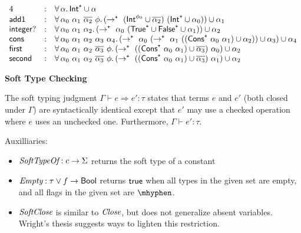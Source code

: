 \documentclass{article}
\begin{document}
\[\begin{array}{l c l}
   4 & : & \forall\,\alpha.\,\mathsf{Int}^{\texttt{+}} \cup \alpha
\\ \mathsf{add1} & : & \forall\,\alpha_0~\alpha_1~\overline{\alpha_2}~\phi.\,(\rightarrow^{\texttt{+}}~(\mathsf{Int}^{\phi_0} \cup \overline{\alpha_2})~(\mathsf{Int}^{\texttt{+}} \cup \alpha_0)) \cup \alpha_1
\\ \mathsf{integer?} & : & \forall\,\alpha_0~\alpha_1~\alpha_2.\,(\rightarrow^{\texttt{+}}~\alpha_0~(\mathsf{True}^{\texttt{+}} \cup \mathsf{False}^{\texttt{+}} \cup \alpha_1)) \cup \alpha_2
\\ \mathsf{cons} & : & \forall\,\alpha_0~\alpha_1~\alpha_2~\alpha_3~\alpha_4.\,(\rightarrow^{\texttt{+}}~\alpha_0~(\rightarrow^{\texttt{+}}~\alpha_1~((\mathsf{Cons}^{\texttt{+}}~\alpha_0~\alpha_1) \cup \alpha_2)) \cup \alpha_3) \cup \alpha_4
\\ \mathsf{first} & : & \forall\,\alpha_0~\alpha_1~\alpha_2~\overline{\alpha_3}~\phi.\,(\rightarrow^{\texttt{+}}~((\mathsf{Cons}^{\texttt{+}}~\alpha_0~\alpha_1) \cup \overline{\alpha_3})~\alpha_0) \cup \alpha_2
\\ \mathsf{second} & : & \forall\,\alpha_0~\alpha_1~\alpha_2~\overline{\alpha_3}~\phi.\,(\rightarrow^{\texttt{+}}~((\mathsf{Cons}^{\texttt{+}}~\alpha_0~\alpha_1) \cup \overline{\alpha_3})~\alpha_1) \cup \alpha_2
  \end{array}\]



\noindent \textbf{Soft Type Checking}

The soft typing judgment $\Gamma \vdash e \Rightarrow e' : \tau$ states that
 terms $e$ and $e'$ (both closed under $\Gamma$) are syntactically identical
 except that $e'$ may use a checked operation where $e$ uses an unchecked one.
Furthermore, $\Gamma \vdash e' : \tau$.

Auxilliaries:
\begin{itemize}
\item $\emph{SoftTypeOf} : c \rightarrow \Sigma$ returns the soft type of a constant
\item $\emph{Empty} : \tau \vee f \rightarrow \mathsf{Bool}$ returns $\mathsf{true}$ when all types in
 the given set are empty, and all flags in the given set are $\fminus$.
\item $\emph{SoftClose}$ is similar to $\emph{Close}$, but does not generalize absent variables.
  Wright's thesis suggests ways to lighten this restriction.
\end{itemize}
\end{document}
